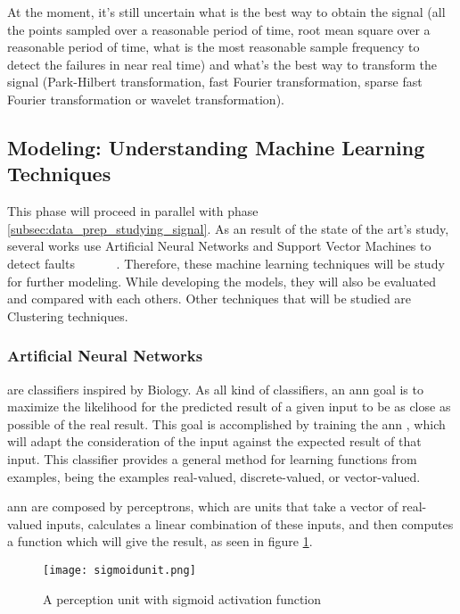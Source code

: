 At the moment, it's still uncertain what is the best way to obtain the signal (all the points sampled over a reasonable period of time, root mean square over a reasonable period of time, what is the most reasonable sample frequency to detect the failures in near real time) and what's the best way to transform the signal (Park-Hilbert transformation, fast Fourier transformation, sparse fast Fourier transformation or wavelet transformation).


\subsection{Modeling: Understanding Machine Learning Techniques}
\label{subsec:modeling_under_machine_learning}

This phase will proceed in parallel with phase \ref{subsec:data_prep_studying_signal}. As an result of the state of the art's study, several works use Artificial Neural Networks and Support Vector Machines to detect faults ~\cite{Toma2011} ~\cite{Wolkiewicz2013} ~\cite{Patel2016} ~\cite{Jagadanand2015}. Therefore, these machine learning techniques will be study for further modeling. While developing the models, they will also be evaluated and compared with each others.  
Other techniques that will be studied are Clustering techniques.

\subsubsection{Artificial Neural Networks}
\label{subsec:ann}

 are classifiers inspired by Biology. As all kind of classifiers, an \Acrshort{ann} goal is to maximize the likelihood for the predicted result of a given input to be as close as possible of the real result. This goal is accomplished by training the \Acrshort{ann} , which will adapt the consideration of the input against the expected result of that input. This classifier provides a general method for learning functions from examples, being the examples real-valued, discrete-valued, or vector-valued.

\Acrshort{ann} are composed by perceptrons, which are units that take a vector of real-valued inputs, calculates a linear combination of these inputs, and then computes a function which will give the result, as seen in figure \ref{fig:sigmoid_unit}.

\begin{figure}[htpb]
\centering
\texttt{[image: sigmoidunit.png]}
\caption{A perception unit with sigmoid activation function}
\label{fig:sigmoid_unit}
\end{figure}


